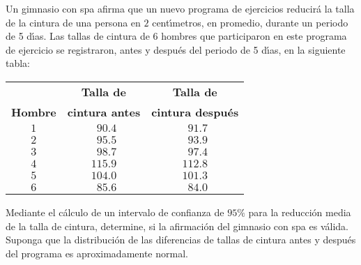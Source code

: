 \begin{enunciado}
 Un gimnasio con spa afirma que un nuevo programa de ejercicios reducir\'a la talla de la cintura de una persona en $2$ cent\'{\i}metros, en promedio, durante un periodo de 5 d\'{\i}as. Las tallas de cintura de $6$ hombres que participaron en este programa de ejercicio se registraron, antes y despu\'es del periodo de 5 d\'{\i}as, en la siguiente tabla:
 \begin{center}
  \begin{tabular}{ccc}
   & \textbf{Talla de} & \textbf{Talla de} \\
   \textbf{Hombre} & \textbf{cintura antes} & \textbf{cintura despu\'es} \\
   \hline 
   $1$ & $\phantom{1}90.4$ & $\phantom{1}91.7$ \\
   $2$ & $\phantom{1}95.5$ & $\phantom{1}93.9$ \\
   $3$ & $\phantom{1}98.7$ & $\phantom{1}97.4$ \\
   $4$ & $115.9$ & $112.8$ \\
   $5$ & $104.0$ & $101.3$ \\
   $6$ & $\phantom{1}85.6$ & $\phantom{1}84.0$
  \end{tabular}
 \end{center}
 Mediante el c\'alculo de un intervalo de confianza de $95\%$ para la reducci\'on media de la talla de cintura, determine, si la afirmaci\'on del gimnasio con spa es v\'alida. Suponga que la distribuci\'on de las diferencias de tallas de cintura antes y despu\'es del programa es aproximadamente normal.
\end{enunciado}

